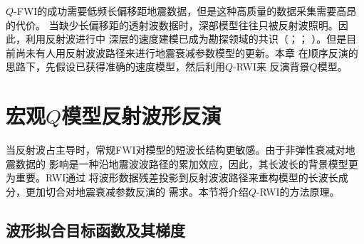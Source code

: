 $Q$-FWI的成功需要低频长偏移距地震数据，但是这种高质量的数据采集需要高昂的代价。
当缺少长偏移距的透射波数据时，深部模型往往只被反射波照明。因此，利用反射波进行中
深层的速度建模已成为勘探领域的共识（；；
）。但是目前尚未有人用反射波波路径来进行地震衰减参数模型的更新。本章
在顺序反演的思路下，先假设已获得准确的速度模型，然后利用$Q$-RWI来
反演背景$Q$模型。

\vspace{0.5cm}
\section{宏观$Q$模型反射波形反演}
\vspace{1.1cm}

当反射波占主导时，常规FWI对模型的短波长结构更敏感。由于非弹性衰减对地震数据的
影响是一种沿地震波波路径的累加效应，因此，其长波长的背景模型更为重要。RWI通过
将波形数据残差投影到反射波波路径来重构模型的长波长成分，更加切合对地震衰减参数反演的
需求。本节将介绍$Q$-RWI的方法原理。

\vspace{0.5cm}
\subsection{波形拟合目标函数及其梯度}
\vspace{1.1cm}

